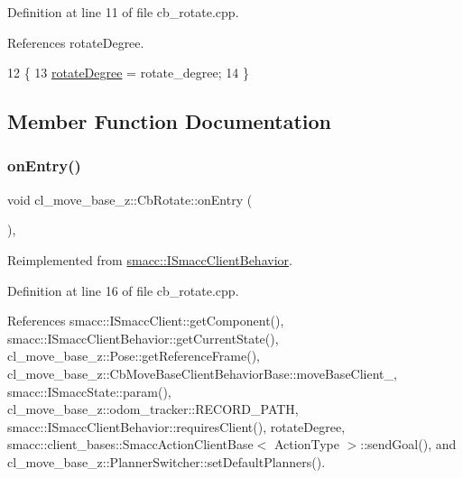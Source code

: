 Definition at line 11 of file cb\+\_\+rotate.\+cpp.



References rotate\+Degree.


\begin{DoxyCode}
12 \{
13     \hyperlink{classcl__move__base__z_1_1CbRotate_a83e9f97e917044f919c98a55d8e00db6}{rotateDegree} = rotate\_degree;
14 \}
\end{DoxyCode}


\subsection{Member Function Documentation}
\mbox{\label{classcl__move__base__z_1_1CbRotate_a316ee51ecfd3f10fd1edae0d7d3b26c0}} 
\subsubsection{\texorpdfstring{on\+Entry()}{onEntry()}}
{\footnotesize\ttfamily void cl\+\_\+move\+\_\+base\+\_\+z\+::\+Cb\+Rotate\+::on\+Entry (\begin{DoxyParamCaption}{ }\end{DoxyParamCaption})\hspace{0.3cm}{\ttfamily [override]}, {\ttfamily [virtual]}}



Reimplemented from \hyperlink{classsmacc_1_1ISmaccClientBehavior_a3ec24a839087c550e1d62a81e48cf530}{smacc\+::\+I\+Smacc\+Client\+Behavior}.



Definition at line 16 of file cb\+\_\+rotate.\+cpp.



References smacc\+::\+I\+Smacc\+Client\+::get\+Component(), smacc\+::\+I\+Smacc\+Client\+Behavior\+::get\+Current\+State(), cl\+\_\+move\+\_\+base\+\_\+z\+::\+Pose\+::get\+Reference\+Frame(), cl\+\_\+move\+\_\+base\+\_\+z\+::\+Cb\+Move\+Base\+Client\+Behavior\+Base\+::move\+Base\+Client\+\_\+, smacc\+::\+I\+Smacc\+State\+::param(), cl\+\_\+move\+\_\+base\+\_\+z\+::odom\+\_\+tracker\+::\+R\+E\+C\+O\+R\+D\+\_\+\+P\+A\+TH, smacc\+::\+I\+Smacc\+Client\+Behavior\+::requires\+Client(), rotate\+Degree, smacc\+::client\+\_\+bases\+::\+Smacc\+Action\+Client\+Base$<$ Action\+Type $>$\+::send\+Goal(), and cl\+\_\+move\+\_\+base\+\_\+z\+::\+Planner\+Switcher\+::set\+Default\+Planners().


